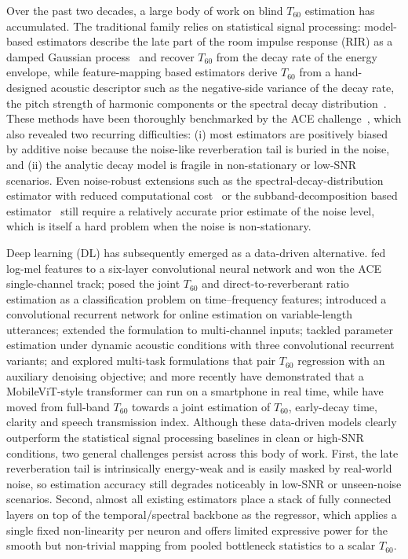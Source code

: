 \documentclass[a4paper,fleqn]{cas-dc}
\begin{document}
Over the past two decades, a large body of work on blind $T_{60}$
estimation has accumulated. The traditional family relies on statistical
signal processing: model-based estimators describe the late part of the
room impulse response (RIR) as a damped Gaussian
process~\citep{polack1988these} and recover $T_{60}$ from the decay rate
of the energy envelope, while feature-mapping based estimators derive
$T_{60}$ from a hand-designed acoustic descriptor such as the negative-side
variance of the decay rate, the pitch strength of harmonic
components or the spectral decay
distribution~\citep{ratnam2003blind, wen2008negativeside, eaton2013sdd,
falk2010temporal, lollmann2010iwaenc}. These methods have been thoroughly
benchmarked by the ACE challenge~\citep{eaton2016ace}, which also revealed
two recurring difficulties: (i) most estimators are positively biased by
additive noise because the noise-like reverberation tail is buried in the
noise, and (ii) the analytic decay model is fragile in non-stationary or
low-SNR scenarios. Even noise-robust extensions such as the
spectral-decay-distribution estimator with reduced computational
cost~\citep{eaton2013sdd} or the subband-decomposition based
estimator~\citep{prego2015subband} still require a relatively accurate
prior estimate of the noise level, which is itself a hard problem when
the noise is non-stationary.

Deep learning (DL) has subsequently emerged as a data-driven alternative.
\citet{gamper2018cnn} fed log-mel features to a six-layer convolutional
neural network and won the ACE single-channel track; \citet{xiong2018ercnn}
posed the joint $T_{60}$ and direct-to-reverberant ratio estimation as a
classification problem on time--frequency features; \citet{deng2020crnn}
introduced a convolutional recurrent network for online estimation on
variable-length utterances; \citet{srivastava2021blindroom} extended the
formulation to multi-channel inputs; \citet{goetz2023online} tackled
parameter estimation under dynamic acoustic conditions with three
convolutional recurrent variants; \citet{zheng2022noiseaware} and
\citet{zhang2024damtl} explored multi-task formulations that pair $T_{60}$
regression with an auxiliary denoising objective; and more recently
\citet{saini2023mobileaudiotransformer} have demonstrated that a
MobileViT-style transformer can run on a smartphone in real time, while
\citet{duangpummet2022stochastic} have moved from full-band $T_{60}$
towards a joint estimation of $T_{60}$, early-decay time, clarity and
speech transmission index. Although these data-driven models clearly
outperform the statistical signal processing baselines in clean or
high-SNR conditions, two general challenges persist across this body of
work. First, the late reverberation tail is intrinsically energy-weak
and is easily masked by real-world noise, so estimation accuracy still
degrades noticeably in low-SNR or unseen-noise scenarios. Second, almost
all existing estimators place a stack of fully connected layers on top
of the temporal/spectral backbone as the regressor, which applies a
single fixed non-linearity per neuron and offers limited expressive
power for the smooth but non-trivial mapping from pooled bottleneck
statistics to a scalar $T_{60}$.
\end{document}
